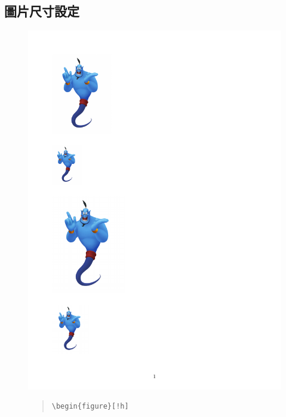 \documentclass[12pt,a4paper]{report}
\begin{document}
\begin{CJK}{UTF8}{bkai}
\section{圖片尺寸設定}
\vspace{-0.5cm}
\begin{figure}[!h] 
\begin{minipage}[b]{0.5\textwidth} 
\centering 
\includegraphics[scale=0.3]{./pics/size_example.pdf} 
\end{minipage}%
\begin{minipage}[b]{0.5\textwidth} 
\begin{footnotesize}
\begin{quote}
\begin{verbatim}
\begin{figure}[!h]

\end{verbatim}
\end{quote}
\end{footnotesize}
\end{minipage}
\end{figure}
\end{CJK}
\end{document}

